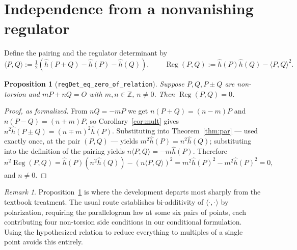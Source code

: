 \documentclass[11pt,reqno]{amsart}
\theoremstyle{plain}
\newtheorem{proposition}[theorem]{Proposition}
\theoremstyle{definition}
\theoremstyle{remark}
\newtheorem{remark}[theorem]{Remark}
\DeclareRobustCommand{\lt}[1]{\texttt{#1}}
\newcommand{\hh}{\widehat{h}}
\DeclareMathOperator{\reg}{Reg}
\begin{document}
\section{Independence from a nonvanishing regulator}

Define the pairing and the regulator determinant by
\[
  \langle P,Q\rangle := \tfrac12\!\left(\hh(P{+}Q) - \hh(P) - \hh(Q)\right),
  \qquad
  \reg(P,Q) := \hh(P)\hh(Q) - \langle P,Q\rangle^2 .
\]

\begin{proposition}[\lt{regDet\_eq\_zero\_of\_relation}]\label{prop:reldet}
Suppose $P, Q, P{\pm}Q$ are non-torsion and $mP + nQ = O$ with
$m,n \in \mathbb{Z}$, $n \ne 0$. Then $\reg(P,Q) = 0$.
\end{proposition}

\begin{proof}[Proof, as formalized]
From $nQ = -mP$ we get $n(P+Q) = (n-m)P$ and $n(P-Q) = (n+m)P$, so
Corollary~\ref{cor:mult} gives $n^2\hh(P \pm Q) = (n \mp m)^2\hh(P)$.
Substituting into Theorem~\ref{thm:par} --- used exactly once, at the pair
$(P,Q)$ --- yields $m^2\hh(P) = n^2\hh(Q)$; substituting into the definition
of the pairing yields $n\langle P,Q\rangle = -m\hh(P)$. Therefore
\[
  n^2 \reg(P,Q) = \hh(P)\left(n^2\hh(Q)\right) -
  \left(n\langle P,Q\rangle\right)^2 = m^2\hh(P)^2 - m^2\hh(P)^2 = 0,
\]
and $n \ne 0$.
\end{proof}

\begin{remark}
Proposition~\ref{prop:reldet} is where the development departs most sharply
from the textbook treatment. The usual route establishes bi-additivity of
$\langle\cdot,\cdot\rangle$ by polarization, requiring the parallelogram law
at some six pairs of points, each contributing four non-torsion side
conditions in our conditional formulation. Using the hypothesized relation
to reduce everything to multiples of a single point avoids this entirely.
\end{remark}
\end{document}
